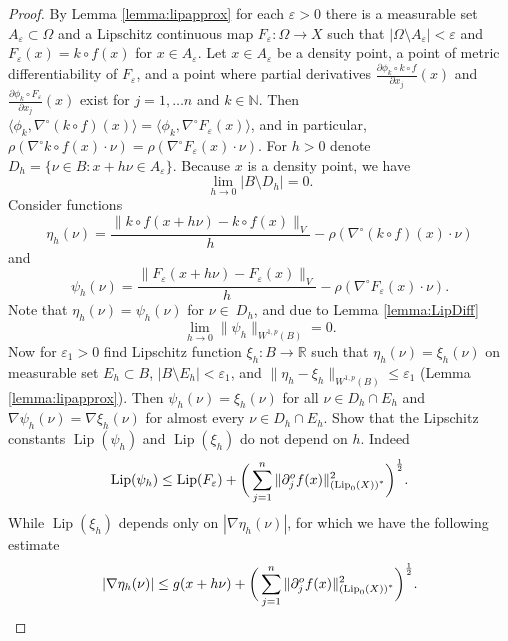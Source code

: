 \documentclass[reqno]{amsart}
\begin{document}
\begin{proof}
By Lemma \ref{lemma:lipapprox} for each $\varepsilon>0$ there is a measurable set $A_\varepsilon\subset\Omega$
and a Lipschitz continuous map $F_\varepsilon:\Omega\to X$ such that $|\Omega\setminus A_\varepsilon|<\varepsilon$
and $F_\varepsilon(x) = k\circ f(x)$ for $x\in A_\varepsilon$. 
Let $x\in A_\varepsilon$ be a density point, a point of metric differentiability of $F_\varepsilon$,
and a point where partial derivatives $\frac{\partial \phi_k\circ k\circ  f}{\partial x_j}(x)$ and $\frac{\partial \phi_k\circ F_\varepsilon}{\partial x_j}(x)$
exist for $j=1,\dots n$ and $k\in \mathbb N$.
Then $\langle \phi_k, \nabla^{\circ} (k\circ f)(x) \rangle = \langle \phi_k, \nabla^{\circ}F_\varepsilon(x) \rangle $,
and in particular, $\rho(\nabla^{\circ}k\circ f(x)\cdot\nu ) = \rho(\nabla^{\circ}F_\varepsilon (x)\cdot\nu )$.
For $h>0$ denote $D_h = \{\nu\in B \colon x + h\nu \in A_\varepsilon\}$.
Because $x$ is a density point, we have 
\begin{equation}\label{eq:BD-0}
\lim_{h\to 0} |B\setminus D_h| = 0.
\end{equation}
Consider functions
\[
\eta_h(\nu) = \frac{\|k\circ f(x+h\nu) - k\circ f(x)\|_V}{h} - \rho(\nabla^{\circ}(k\circ f)(x)\cdot\nu )
\]
and
\[
\psi_h(\nu) = \frac{\| F_\varepsilon(x+h\nu) -  F_\varepsilon(x)\|_V}{h} - \rho(\nabla^{\circ}F_\varepsilon (x)\cdot\nu ).
\]
Note that $\eta_h(\nu) = \psi_h(\nu)$ for $\nu\in\ D_h$, and
due to Lemma \ref{lemma:LipDiff} 
\begin{equation}\label{eq:psi-0}
\lim_{h\to 0} \| \psi_h\|_{W^{1,p}(B)} = 0.
\end{equation} 
Now for $\varepsilon_1>0$ find Lipschitz function $\xi_h:B\to \mathbb R$ such that 
$\eta_h(\nu) = \xi_h(\nu)$ on measurable set $E_h\subset B$, $|B\setminus E_h| < \varepsilon_1$, and
$\|\eta_h - \xi_h \|_{W^{1,p}(B)}\leq\varepsilon_1$ (Lemma \ref{lemma:lipapprox}).
Then $\psi_h(\nu) = \xi_h(\nu)$ for all $\nu\in D_h\cap E_h$ and $\nabla\psi_h(\nu) = \nabla\xi_h(\nu)$ for almost every $\nu\in D_h\cap E_h$.
Show that the Lipschitz constants $\operatorname{Lip}(\psi_h)$ and $\operatorname{Lip}(\xi_h)$ do not depend on $h$.
Indeed
\[
\operatorname{Lip}(\psi_h) \leq \operatorname{Lip}(F_\varepsilon) + \bigg(\sum_{j=1}^n \|\partial^o_jf(x) \|^2_{\left(\textnormal{Lip}_{0}(X)\right)^*} \bigg)^{\frac{1}{2}}.
\]
While $\operatorname{Lip}(\xi_h)$ depends only on $|\nabla \eta_h (\nu)|$, for which we have the following estimate
\[
|\nabla \eta_h(\nu)| \leq g(x + h\nu) + \bigg(\sum_{j=1}^n \|\partial^o_jf(x) \|^2_{\left(\textnormal{Lip}_{0}(X)\right)^*} \bigg)^{\frac{1}{2}}.
\]
\end{proof}
\end{document}
